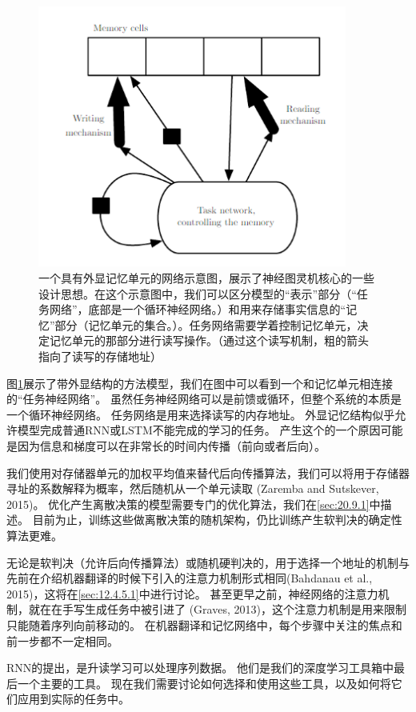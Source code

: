 \begin{figure}[htbp] %
   \centering
   \includegraphics[width=4in]{fig/chap10/10_18.PNG} 
   \caption{一个具有外显记忆单元的网络示意图，展示了神经图灵机核心的一些设计思想。在这个示意图中，我们可以区分模型的“表示”部分（“任务网络”，底部是一个循环神经网络。）和用来存储事实信息的“记忆”部分（记忆单元的集合。）。任务网络需要学着控制记忆单元，决定记忆单元的那部分进行读写操作。（通过这个读写机制，粗的箭头指向了读写的存储地址）}
   \label{fig:10_18}
\end{figure}


图\ref{fig:10_18}展示了带外显结构的方法模型，我们在图中可以看到一个和记忆单元相连接的“任务神经网络”。
虽然任务神经网络可以是前馈或循环，但整个系统的本质是一个循环神经网络。
任务网络是用来选择读写的内存地址。
外显记忆结构似乎允许模型完成普通RNN或LSTM不能完成的学习的任务。
产生这个的一个原因可能是因为信息和梯度可以在非常长的时间内传播（前向或者后向）。


我们使用对存储器单元的加权平均值来替代后向传播算法，我们可以将用于存储器寻址的系数解释为概率，然后随机从一个单元读取 (Zaremba and Sutskever, 2015)。
优化产生离散决策的模型需要专门的优化算法，我们在\ref{sec:20.9.1}中描述。
目前为止，训练这些做离散决策的随机架构，仍比训练产生软判决的确定性算法更难。

无论是软判决（允许后向传播算法）或随机硬判决的，用于选择一个地址的机制与先前在介绍机器翻译的时候下引入的注意力机制形式相同(Bahdanau et al., 2015)，这将在\ref{sec:12.4.5.1}中进行讨论。
甚至更早之前，神经网络的注意力机制，就在在手写生成任务中被引进了 (Graves, 2013)，这个注意力机制是用来限制只能随着序列向前移动的。
在机器翻译和记忆网络中，每个步骤中关注的焦点和前一步都不一定相同。

RNN的提出，是升读学习可以处理序列数据。
他们是我们的深度学习工具箱中最后一个主要的工具。
现在我们需要讨论如何选择和使用这些工具，以及如何将它们应用到实际的任务中。




